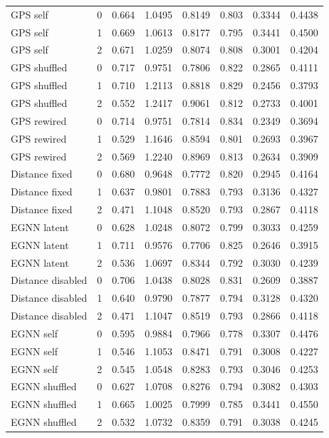 \begin{longtable}{@{}lrrrrrrr@{}}
GPS self & 0 & 0.664 & 1.0495 & 0.8149 & 0.803 & 0.3344 & 0.4438 \\
GPS self & 1 & 0.669 & 1.0613 & 0.8177 & 0.795 & 0.3441 & 0.4500 \\
GPS self & 2 & 0.671 & 1.0259 & 0.8074 & 0.808 & 0.3001 & 0.4204 \\
GPS shuffled & 0 & 0.717 & 0.9751 & 0.7806 & 0.822 & 0.2865 & 0.4111 \\
GPS shuffled & 1 & 0.710 & 1.2113 & 0.8818 & 0.829 & 0.2456 & 0.3793 \\
GPS shuffled & 2 & 0.552 & 1.2417 & 0.9061 & 0.812 & 0.2733 & 0.4001 \\
GPS rewired & 0 & 0.714 & 0.9751 & 0.7814 & 0.834 & 0.2349 & 0.3694 \\
GPS rewired & 1 & 0.529 & 1.1646 & 0.8594 & 0.801 & 0.2693 & 0.3967 \\
GPS rewired & 2 & 0.569 & 1.2240 & 0.8969 & 0.813 & 0.2634 & 0.3909 \\
Distance fixed & 0 & 0.680 & 0.9648 & 0.7772 & 0.820 & 0.2945 & 0.4164 \\
Distance fixed & 1 & 0.637 & 0.9801 & 0.7883 & 0.793 & 0.3136 & 0.4327 \\
Distance fixed & 2 & 0.471 & 1.1048 & 0.8520 & 0.793 & 0.2867 & 0.4118 \\
EGNN latent & 0 & 0.628 & 1.0248 & 0.8072 & 0.799 & 0.3033 & 0.4259 \\
EGNN latent & 1 & 0.711 & 0.9576 & 0.7706 & 0.825 & 0.2646 & 0.3915 \\
EGNN latent & 2 & 0.536 & 1.0697 & 0.8344 & 0.792 & 0.3030 & 0.4239 \\
Distance disabled & 0 & 0.706 & 1.0438 & 0.8028 & 0.831 & 0.2609 & 0.3887 \\
Distance disabled & 1 & 0.640 & 0.9790 & 0.7877 & 0.794 & 0.3128 & 0.4320 \\
Distance disabled & 2 & 0.471 & 1.1047 & 0.8519 & 0.793 & 0.2866 & 0.4118 \\
EGNN self & 0 & 0.595 & 0.9884 & 0.7966 & 0.778 & 0.3307 & 0.4476 \\
EGNN self & 1 & 0.546 & 1.1053 & 0.8471 & 0.791 & 0.3008 & 0.4227 \\
EGNN self & 2 & 0.545 & 1.0548 & 0.8283 & 0.793 & 0.3046 & 0.4253 \\
EGNN shuffled & 0 & 0.627 & 1.0708 & 0.8276 & 0.794 & 0.3082 & 0.4303 \\
EGNN shuffled & 1 & 0.665 & 1.0025 & 0.7999 & 0.785 & 0.3441 & 0.4550 \\
EGNN shuffled & 2 & 0.532 & 1.0732 & 0.8359 & 0.791 & 0.3038 & 0.4245 \\

\end{longtable}
